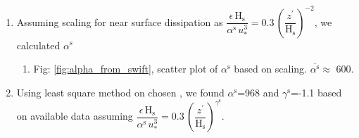 \documentclass[final]{svjour3}
\begin{document}
\begin{enumerate}
\begin{enumerate}
\begin{enumerate}
          \item Assuming \cite{Terrayetal96} scaling for near surface
          dissipation as $\dfrac{\epsilon \, \mathrm{H}_\mathrm{s}}{\alpha^\mathrm{s} \, u_*^3} =
          0.3 \, \left(\dfrac{z^ \prime}{\mathrm{H}_\mathrm{s}}  \right)^{-2}$, we calculated
          $\alpha^\mathrm{s}$
          \begin{enumerate}
              \item Fig: \ref{fig:alpha_from_swift}, scatter plot of
              $\alpha^\mathrm{s}$ based on \cite{Terrayetal96} scaling.
              $\overline{\alpha^\mathrm{s}}\approx$ 600.
          \end{enumerate}
          \item Using least square method on chosen , we found 
          $\alpha^\mathrm{s}$=968 and $\gamma^\mathrm{s}$=-1.1 based on
          available data assuming $\dfrac{\epsilon \, \mathrm{H}_\mathrm{s}}{\alpha^\mathrm{s} \,
          u_*^3} = 0.3 \, \left(\dfrac{z^ \prime}{\mathrm{H}_\mathrm{s}} 
          \right)^{\gamma^\mathrm{s}}$.   


\end{enumerate}
\end{enumerate}
\end{enumerate}
\end{document}
